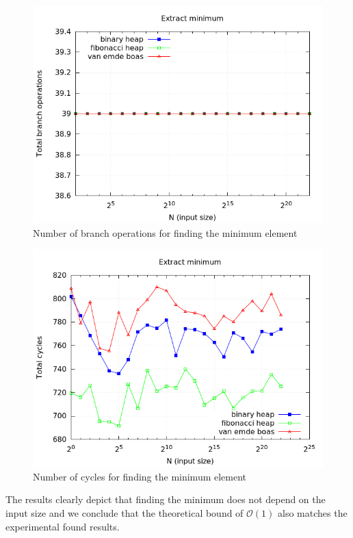 \documentclass[a4paper,oneside,article,11pt]{memoir}
\begin{document}
\begin{figure}[H]
\centering
\includegraphics[scale=0.5]{../res2/findmin/extract_min_branch.png}
\caption{Number of branch operations for finding the minimum element}
\label{fig:findmin_br}
\end{figure}

\begin{figure}[H]
\centering
\includegraphics[scale=0.5]{../res2/findmin/extract_min_cycles.png}
\caption{Number of cycles for finding the minimum element}
\label{fig:findmin_cyc}
\end{figure}

The results clearly depict that finding the minimum does not depend on the input size and we conclude that the theoretical bound of $\mathcal{O}(1)$ also matches the experimental found results.
\end{document}
